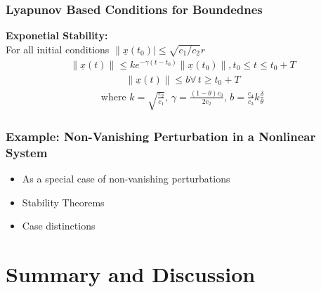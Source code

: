 \documentclass[student, noshadow, lsr, english, aspectratio=169, t]{ITR_LSR_slides}
\begin{document}
\begin{frame}
	\frametitle{Lyapunov Based Conditions for Boundednes}
	\textbf{Exponetial Stability:} \\
	For all initial conditions $\|\underline{x}(t_0)|\leq \sqrt{c_1/c_2}r$
	\begin{align*}
		\|\underline{x}(t)\| \leq ke^{-\gamma(t-t_0)}\|\underline{x}(t_0)\|, t_0 \leq t \leq t_0+T
	\end{align*}
	\begin{align*}
		\|\underline{x}(t)\| \leq b \forall\, t \geq t_0+T
	\end{align*}
	\begin{align*}
		\text{where } k=\sqrt{\frac{c_2}{c_1}},\,\gamma=\frac{(1-\theta)c_3}{2c_2},\, b=\frac{c_4}{c_3}k\frac{\delta}{\theta}
	\end{align*}
\end{frame}


\begin{frame}
	\frametitle{Example: Non-Vanishing Perturbation in a Nonlinear System}
	\begin{itemize}
		\item As a special case of non-vanishing perturbations
		\item Stability Theorems
		\item Case distinctions
	\end{itemize}
\end{frame}

\section{Summary and Discussion}

\end{document}
